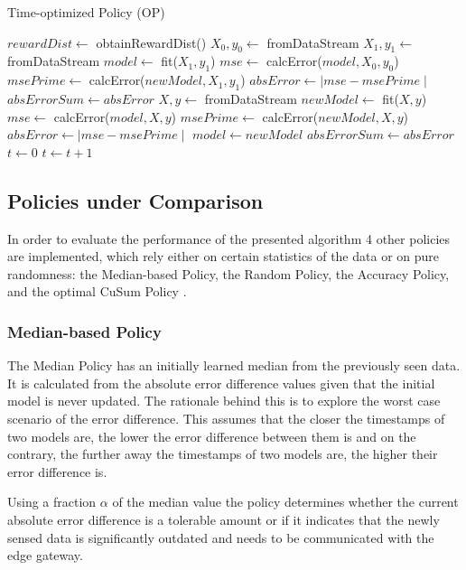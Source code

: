 \documentclass{mpaper}
\begin{document}
\begin{algorithm}
\caption{Time-optimized Policy (OP)}\label{polOP}
\begin{algorithmic}
\State $rewardDist \gets$ obtainRewardDist() 
\State $X_0, y_0 \gets$ fromDataStream
\State $X_1, y_1 \gets$ fromDataStream
\State $model \gets$ fit($X_1, y_1$)
\State $mse \gets$ calcError($model,X_0,y_0$)
\State $msePrime \gets$ calcError($newModel,X_1,y_1$)
\State $absError \gets \mid mse - msePrime \mid$
\State $absErrorSum \gets absError$
    \State $X, y \gets$ fromDataStream
    \State $newModel \gets$ fit($X,y$)
    \State $mse \gets$ calcError($model,X,y$)
    \State $msePrime \gets$ calcError($newModel,X,y$)
    \State $absError \gets \mid mse - msePrime \mid$
        \State $model \gets newModel$ 
        \State $absErrorSum \gets absError$
        \State $t \gets 0$
    \EndIf
    \State $t \gets t + 1$
\EndWhile
\end{algorithmic}
\end{algorithm}

\subsection{Policies under Comparison}
In order to evaluate the performance of the presented algorithm 4 other policies are implemented, which rely either on certain statistics of the data or on pure randomness: the Median-based Policy, the Random Policy, the Accuracy Policy, and the optimal CuSum Policy \cite{cusum_pierre}.

\subsubsection{Median-based Policy}
The Median Policy has an initially learned median from the previously seen data. It is calculated from the absolute error difference values given that the initial model is never updated. 
The rationale behind this is to explore the worst case scenario of the error difference. This assumes that the closer the timestamps of two models are, the lower the error difference between them is and on the contrary, the further away the timestamps of two models are, the higher their error difference is.

Using a fraction $\alpha$ of the median value the policy determines whether the current absolute error difference is a tolerable amount or if it indicates that the newly sensed data is significantly outdated and needs to be communicated with the edge gateway.
\end{document}
